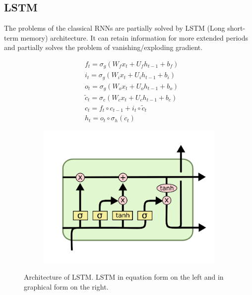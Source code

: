 \subsection{LSTM}

The problems of the classical RNNs are partially solved by LSTM (Long short-term memory) architecture. It can retain information for more extended periods and partially solves the problem of vanishing/exploding gradient.

\begin{figure}[H]
\centering
\begin{subfigure}[b]{0.5\textwidth}
    \centering
\begin{align*}
& f_t = \sigma_g(W_{f} x_t + U_{f} h_{t-1} + b_f) \\
& i_t = \sigma_g(W_{i} x_t + U_{i} h_{t-1} + b_i) \\
& o_t = \sigma_g(W_{o} x_t + U_{o} h_{t-1} + b_o) \\
& \tilde{c}_t = \sigma_c(W_{c} x_t + U_{c} h_{t-1} + b_c) \\
& c_t = f_t \circ c_{t-1} + i_t \circ \tilde{c}_t \\
& h_t = o_t \circ \sigma_h(c_t)
\end{align*}
  \end{subfigure}
\begin{subfigure}[b]{0.45\textwidth}
    \centering
    \includegraphics[width=\linewidth]{figures/chapter3/lstm.png}
  \end{subfigure}
\caption[lstm]{Architecture of LSTM. LSTM in equation form on the left and in graphical form on the right\footnotemark. }
\label{fig:lstm}
\end{figure}

